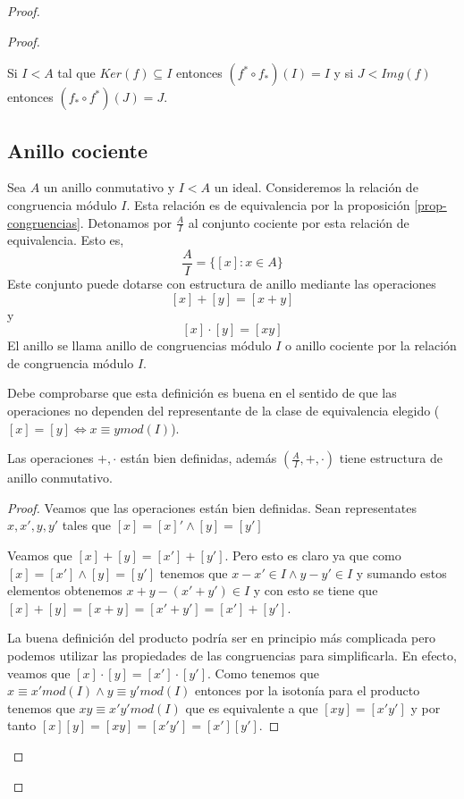 \begin{proof}
\begin{proof}
\begin{proposition}
Si $I<A$ tal que $Ker(f) \subseteq I$ entonces $(f^*\circ f_*)(I) = I$ y si $J < Img(f)$ entonces $(f_* \circ f^*)(J) = J$. 
\end{proposition}


\subsection{Anillo cociente}

\begin{definition}
	Sea $A$ un anillo conmutativo y $I < A$ un ideal. Consideremos la relación de congruencia módulo $I$. Esta relación es de equivalencia por la proposición \ref{prop-congruencias}. Detonamos por $\frac{A}{I}$ al conjunto cociente por esta relación de equivalencia. Esto es, $$\frac{A}{I} = \{[x]:x \in A\}$$ Este conjunto puede dotarse con estructura de anillo mediante las operaciones $$[x]+[y] = [x+y]$$ y $$[x] \cdot [y] = [xy]$$ El anillo se llama anillo de congruencias módulo $I$ o anillo cociente por la relación de congruencia módulo $I$. 
\end{definition}

Debe comprobarse que esta definición es buena en el sentido de que las operaciones no dependen del representante de la clase de equivalencia elegido ($[x] = [y] \iff x \equiv y mod(I)$).

\begin{proposition}
	Las operaciones $+,\cdot$ están bien definidas, además $(\frac{A}{I},+,\cdot)$ tiene estructura de anillo conmutativo.
\end{proposition}
\begin{proof}
	Veamos que las operaciones están bien definidas. Sean representates $x,x',y,y'$ tales que $[x] = [x]' \land [y] = [y']$ 
	
	Veamos que $[x] + [y] = [x'] + [y']$. Pero esto es claro ya que como $[x] = [x'] \land [y] = [y']$ tenemos que $x-x' \in I \land y-y' \in I$ y sumando estos elementos obtenemos $x+y - (x'+y') \in I$ y con esto se tiene que $[x] + [y] = [x+y] = [x'+y'] = [x']+[y']$. 
	
	La buena definición del producto podría ser en principio más complicada pero podemos utilizar las propiedades de las congruencias para simplificarla. En efecto, veamos que $[x] \cdot [y] = [x'] \cdot [y']$. Como tenemos que $x \equiv x' mod(I) \land y \equiv y' mod(I)$ entonces por la isotonía para el producto tenemos que $xy \equiv x'y' mod(I)$ que es equivalente a que $[xy] = [x'y']$ y por tanto $[x][y] = [xy] = [x'y'] = [x'][y']$. 
	

\end{proof}
\end{proof}
\end{proof}
